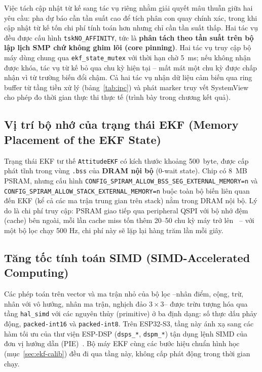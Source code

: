 Việc tách cập nhật từ kế sang tác vụ riêng nhằm giải quyết mâu thuẫn giữa hai yêu cầu: pha dự báo cần tần suất cao để tích phân con quay chính xác, trong khi cập nhật từ kế tốn chi phí tính toán hơn nhưng chỉ cần tần suất thấp. Hai tác vụ đều được cấu hình \texttt{tskNO\_AFFINITY}, tức là \textbf{phân tách theo tần suất trên bộ lập lịch SMP chứ không ghim lõi (core pinning)}. Hai tác vụ truy cập bộ máy dùng chung qua \texttt{ekf\_state\_mutex} với thời hạn chờ 5~ms; nếu không nhận được khóa, tác vụ từ kế bỏ qua chu kỳ hiện tại -- mất mát một chu kỳ được chấp nhận vì từ trường biến đổi chậm. Cả hai tác vụ nhận dữ liệu cảm biến qua ring buffer từ tầng tiền xử lý (bảng~\ref{tab:ipc}) và phát marker truy vết SystemView cho phép đo thời gian thực thi thực tế (trình bày trong chương kết quả).

\subsection{Vị trí bộ nhớ của trạng thái EKF (Memory Placement of the EKF State)}

Trạng thái EKF tư thế \texttt{AttitudeEKF} có kích thước khoảng 500~byte, được cấp phát tĩnh trong vùng \texttt{.bss} của \textbf{DRAM nội bộ} (0-wait state). Chip có 8~MB PSRAM, nhưng cấu hình \texttt{CONFIG\_SPIRAM\_ALLOW\allowbreak\_BSS\allowbreak\_SEG\allowbreak\_EXTERNAL\allowbreak\_MEMORY=n} và \texttt{CONFIG\_SPIRAM\_ALLOW\allowbreak\_STACK\allowbreak\_EXTERNAL\allowbreak\_MEMORY=n} buộc toàn bộ biến liên quan đến EKF (kể cả các ma trận trung gian trên stack) nằm trong DRAM nội bộ. Lý do là chi phí truy cập: PSRAM giao tiếp qua peripheral QSPI với bộ nhớ đệm (cache) bên ngoài, mỗi lần cache miss tốn thêm 20--50 chu kỳ máy trở lên~\cite{trm} -- với một bộ lọc chạy 500 Hz, chi phí này sẽ lặp lại hàng trăm lần mỗi giây.

\subsection{Tăng tốc tính toán SIMD (SIMD-Accelerated Computing)}
\label{sec:ekf-simd}

Các phép toán trên vector và ma trận nhỏ của bộ lọc --nhân điểm, cộng, trừ, nhân với vô hướng, nhân ma trận, nghịch đảo $3\times 3$-- được trừu tượng hóa qua tầng \texttt{hal\_simd} với các nguyên thủy (primitive) ở ba định dạng: số thực dấu phảy động, \texttt{packed-int16} và \texttt{packed-int8}. Trên ESP32-S3, tầng này ánh xạ sang các hàm tối ưu của thư viện ESP-DSP (\texttt{dsps\_*}, \texttt{dspm\_*}) tận dụng lệnh SIMD của đơn vị hướng dẫn (PIE)~\cite{trm}. Bộ máy EKF cùng các bước hiệu chuẩn hình học (mục~\ref{sec:ekf-calib}) đều đi qua tầng này, không cấp phát động trong thời gian chạy.

